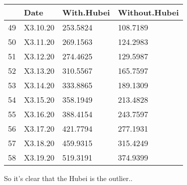 \documentclass[11pt]{article}
\begin{document}
    \begin{tabular}{r|lll}
  & Date & With.Hubei & Without.Hubei\\
\hline
	49 & X3.10.20 & 253.5824 & 108.7189\\
	50 & X3.11.20 & 269.1563 & 124.2983\\
	51 & X3.12.20 & 274.4625 & 129.5987\\
	52 & X3.13.20 & 310.5567 & 165.7597\\
	53 & X3.14.20 & 333.8865 & 189.1309\\
	54 & X3.15.20 & 358.1949 & 213.4828\\
	55 & X3.16.20 & 388.4154 & 243.7597\\
	56 & X3.17.20 & 421.7794 & 277.1931\\
	57 & X3.18.20 & 459.9315 & 315.4249\\
	58 & X3.19.20 & 519.3191 & 374.9399\\
\end{tabular}


    
    So it's clear that the Hubei is the outlier..
\end{document}
